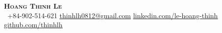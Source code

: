 \begin{center}
    \textbf{\Huge \scshape Hoang Thinh Le} \\ \vspace{1pt}
     \ \small +84-902-514-621 \quad
    \href{mailto:thinhlh0812@gmail.com}{ \underline{thinhlh0812@gmail.com}} \quad
    \href{https://www.linkedin.com/in/le-hoang-thinh/}{ \underline{linkedin.com/le-hoang-thinh}} \quad
    \href{https://github.com/thinhlh}{ \underline{github.com/thinhlh}}
\end{center}